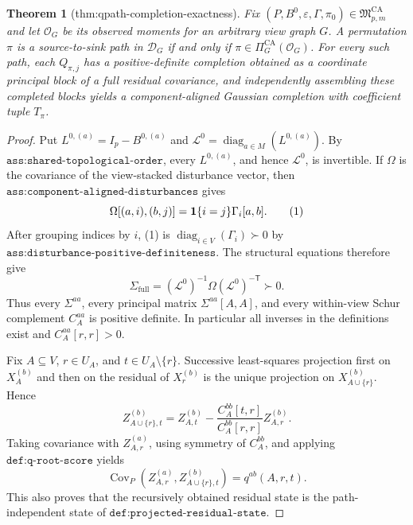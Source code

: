 \documentclass{article}
\newtheorem{theorem}{Theorem}
\begin{document}
\begin{theorem}[thm:qpath-completion-exactness]\label{thm:qpath-completion-exactness}
Fix \((P,B^0,\varepsilon,\Gamma,\pi_0)\in\mathfrak M_{p,m}^{\mathrm{CA}}\) and let \(\mathcal O_G\) be its observed moments for an arbitrary view graph \(G\). A permutation \(\pi\) is a source-to-sink path in \(\mathcal D_G\) if and only if \(\pi\in\Pi_G^{\mathrm{CA}}(\mathcal O_G)\). For every such path, each \(Q_{\pi,j}\) has a positive-definite completion obtained as a coordinate principal block of a full residual covariance, and independently assembling these completed blocks yields a component-aligned Gaussian completion with coefficient tuple \(T_\pi\).
\end{theorem}
\begin{proof}
Put \(L^{0,(a)}=I_p-B^{0,(a)}\) and \(\mathcal L^0=\operatorname{diag}_{a\in M}(L^{0,(a)})\).  By \(\texttt{ass:shared-topological-order}\), every \(L^{0,(a)}\), and hence \(\mathcal L^0\), is invertible.  If \(\Omega\) is the covariance of the view-stacked disturbance vector, then \(\texttt{ass:component-aligned-disturbances}\) gives
\[
 \Omega[(a,i),(b,j)]={\bf1}\{i=j\}\Gamma_i[a,b].
 \tag{1}
\]
After grouping indices by \(i\), (1) is \(\operatorname{diag}_{i\in V}(\Gamma_i)\succ0\) by \(\texttt{ass:disturbance-positive-definiteness}\).  The structural equations therefore give
\[
 \Sigma_{\mathrm{full}}
 = (\mathcal L^0)^{-1}\Omega(\mathcal L^0)^{-\mathsf T}\succ0.
 \tag{2}
\]
Thus every \(\Sigma^{aa}\), every principal matrix \(\Sigma^{aa}[A,A]\), and every within-view Schur complement \(C_A^{aa}\) is positive definite.  In particular all inverses in the definitions exist and \(C_A^{aa}[r,r]>0\).

Fix \(A\subseteq V\), \(r\in U_A\), and \(t\in U_A\setminus\{r\}\).  Successive least-squares projection first on \(X_A^{(b)}\) and then on the residual of \(X_r^{(b)}\) is the unique projection on \(X_{A\cup\{r\}}^{(b)}\).  Hence
\[
 Z_{A\cup\{r\},t}^{(b)}
 =Z_{A,t}^{(b)}-
 \frac{C_A^{bb}[t,r]}{C_A^{bb}[r,r]}Z_{A,r}^{(b)}.
\]
Taking covariance with \(Z_{A,r}^{(a)}\), using symmetry of \(C_A^{bb}\), and applying \(\texttt{def:q-root-score}\) yields
\[
 \operatorname{Cov}_P(Z_{A,r}^{(a)},Z_{A\cup\{r\},t}^{(b)})
 =q^{ab}(A,r,t).
 \tag{3}
\]
This also proves that the recursively obtained residual state is the path-independent state of \(\texttt{def:projected-residual-state}\).


\end{proof}
\end{document}
